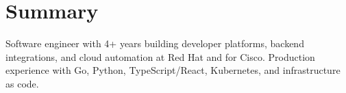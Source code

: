 \section{Summary}
Software engineer with 4+ years building developer platforms, backend integrations, and cloud automation at Red Hat and for Cisco. Production experience with Go, Python, TypeScript/React, Kubernetes, and infrastructure as code.
